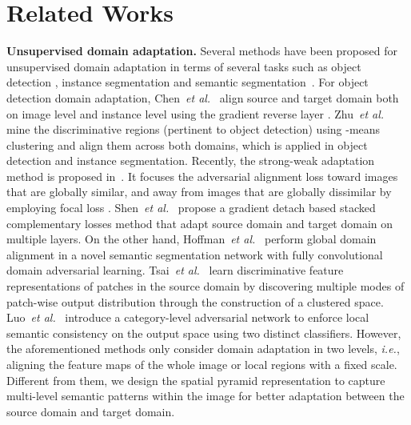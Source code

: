 \documentclass[runningheads]{llncs}
\def\ie{{\em i.e.}}
\def\etal{{\em et al.}}
\begin{document}
\section{Related Works}
{\noindent \textbf{Unsupervised domain adaptation.}} Several methods have been proposed for unsupervised domain adaptation in terms of several tasks such as object detection \cite{DBLP:conf/cvpr/Chen0SDG18,DBLP:conf/cvpr/SaitoUHS19,DBLP:journals/corr/abs-1911-02559}, instance segmentation \cite{DBLP:conf/cvpr/ZhuPYSL19} and semantic segmentation~\cite{DBLP:journals/corr/HoffmanWYD16,DBLP:journals/corr/abs-1901-05427,DBLP:conf/cvpr/Luo0GYY19}. For object detection domain adaptation, Chen~\etal~ \cite{DBLP:conf/cvpr/Chen0SDG18} align source and target domain both on image level and instance level using the gradient reverse layer \cite{DBLP:conf/icml/GaninL15}. Zhu~\etal~\cite{DBLP:conf/cvpr/ZhuPYSL19} mine the discriminative regions (pertinent to object detection) using -means clustering and align them across both domains, which is applied in object detection and instance segmentation. Recently, the strong-weak adaptation method is proposed in~\cite{DBLP:conf/cvpr/SaitoUHS19}. It focuses the adversarial alignment loss toward images that are globally similar, and away from images that are globally dissimilar by employing focal loss \cite{DBLP:conf/iccv/LinGGHD17}. Shen~\etal~\cite{DBLP:journals/corr/abs-1911-02559} propose a gradient detach based stacked complementary losses method that adapt source domain and target domain on multiple layers. On the other hand, Hoffman~\etal~\cite{DBLP:journals/corr/HoffmanWYD16} perform global domain alignment in a novel semantic segmentation network with fully convolutional domain adversarial learning. Tsai~\etal~\cite{DBLP:journals/corr/abs-1901-05427} learn discriminative feature representations of patches in the source domain by discovering multiple modes of patch-wise output distribution through the construction of a clustered space. Luo~\etal~\cite{DBLP:conf/cvpr/Luo0GYY19} introduce a category-level adversarial network to enforce local semantic consistency on the output space using two distinct classifiers. However, the aforementioned methods only consider domain adaptation in two levels, \ie, aligning the feature maps of the whole image or local regions with a fixed scale. Different from them, we design the spatial pyramid representation to capture multi-level semantic patterns within the image for better adaptation between the source domain and target domain.
\end{document}
